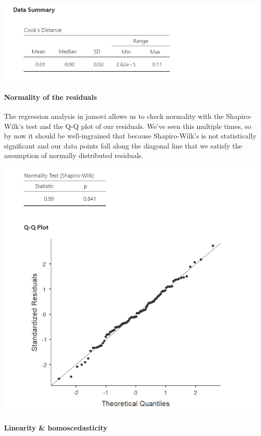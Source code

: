 \documentclass[
]{book}
\begin{document}
\includegraphics{images/13-regression/regression-cooks.png}

\hypertarget{normality-of-the-residuals}{%
\paragraph{Normality of the residuals}\label{normality-of-the-residuals}}

The regression analysis in jamovi allows us to check normality with the Shapiro-Wilk's test and the Q-Q plot of our residuals. We've seen this multiple times, so by now it should be well-ingrained that because Shapiro-Wilk's is not statistically significant and our data points fall along the diagonal line that we satisfy the assumption of normally distributed residuals.

\includegraphics{images/13-regression/regression-normality.png}

\hypertarget{linearity-homoscedasticity}{%
\paragraph{Linearity \& homoscedasticity}\label{linearity-homoscedasticity}}
\end{document}
